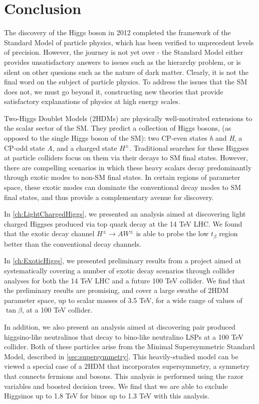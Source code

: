 \chapter{Conclusion}\label{ch:Conclusion}
The discovery of the Higgs boson in 2012 completed the framework of the Standard Model of particle physics, which has been verified to unprecedent levels of precision. However, the journey is not yet over - the Standard Model either provides unsatisfactory answers to issues such as the hierarchy problem, or is silent on other quesions such as the nature of dark matter. Clearly, it is not the final word on the subject of particle physics. To address the issues that the SM does not, we must go beyond it, constructing new theories that provide satisfactory explanations of physics at high energy scales. 

Two-Higgs Doublet Models ($2$HDMs) are physically well-motivated extensions to the scalar sector of the SM. They predict a collection of Higgs bosons, (as opposed to the single Higgs boson of the SM): two CP-even states \emph{h} and \emph{H}, a CP-odd state \emph{A}, and a charged state $H^\pm$.
Traditional searches for these Higgses at particle colliders focus on them via their decays to SM final states. However, there are compelling scenarios in which these heavy scalars decay predominantly through exotic modes to non-SM final states. In certain regions of parameter space, these exotic modes can dominate the conventional decay modes to SM final states, and thus provide a complementary avenue for discovery. 

In \autoref{ch:LightChargedHiggs}, we presented an analysis aimed at discovering light charged Higgses produced via top quark decay at the 14 TeV LHC. We found that the exotic decay channel $H^\pm\rightarrow AW^\pm$ is able to probe the low $t_\beta$ region better than the conventional decay channels.

In \autoref{ch:ExoticHiggs}, we presented preliminary results from a project aimed at systematically covering a number of exotic decay scenarios through collider analyses for both the 14 TeV LHC and a future 100 TeV collider. We find that the preliminary results are promising, and cover a large swathe of $2$HDM parameter space, up to scalar masses of 3.5 TeV, for a wide range of values of $\tan\beta$, at a 100 TeV collider.

In addition, we also present an analysis aimed at discovering pair produced higgsino-like neutralinos that decay to bino-like neutralino LSPs at a 100 TeV collider. Both of these particles arise from the Minimal Supersymmetric Standard Model, described in \autoref{sec:supersymmetry}. This heavily-studied model can be viewed a special case of a $2$HDM that incorporates supersymmetry, a symmetry that connects fermions and bosons. This analysis is performed using the razor variables and boosted decision trees. We find that we are able to exclude Higgsinos up to 1.8 TeV for binos up to 1.3 TeV with this analysis.

